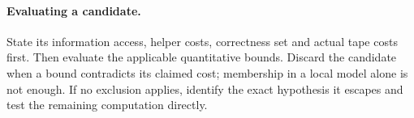 \paragraph{Evaluating a candidate.}
State its information access, helper costs, correctness set and actual tape
costs first. Then evaluate the applicable quantitative bounds. Discard the
candidate when a bound contradicts its claimed cost; membership in a local
model alone is not enough. If no exclusion applies, identify the exact
hypothesis it escapes and test the remaining computation directly.
